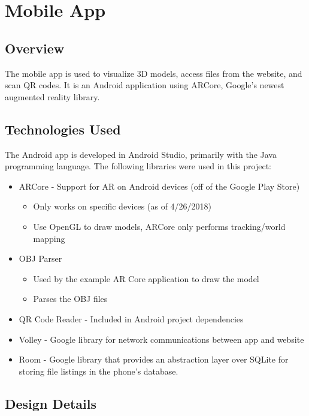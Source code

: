 
\section{Mobile App}

    \subsection{Overview}
The mobile app is used to visualize 3D models, access files from the website, and scan QR codes. It is an Android application using ARCore, Google's newest augmented reality library.
    \subsection{Technologies Used}
The Android app is developed in Android Studio, primarily with the Java programming language. The following libraries were used in this project:
    \begin{itemize}
        \item ARCore - Support for AR on Android devices (off of the Google Play Store)
        \begin{itemize}
            \item Only works on specific devices (as of 4/26/2018)
            \item Use OpenGL to draw models, ARCore only performs tracking/world mapping
        \end{itemize}
        \item OBJ Parser
        \begin{itemize}
            \item Used by the example AR Core application to draw the model
            \item Parses the OBJ files
        \end{itemize}
        \item QR Code Reader - Included in Android project dependencies
        \item Volley - Google library for network communications between app and website
        \item Room - Google library that provides an abstraction layer over SQLite for storing file listings in the phone's database.
    \end{itemize}

    \subsection{Design Details}
    
